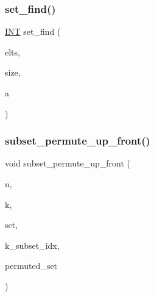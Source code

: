 \subsubsection{\texorpdfstring{set\+\_\+find()}{set\_find()}}
{\footnotesize\ttfamily \mbox{\hyperlink{galois_8h_a09fddde158a3a20bd2dcadb609de11dc}{I\+NT}} set\+\_\+find (\begin{DoxyParamCaption}\item[{\mbox{\hyperlink{galois_8h_a09fddde158a3a20bd2dcadb609de11dc}{I\+NT}} $\ast$}]{elts,  }\item[{\mbox{\hyperlink{galois_8h_a09fddde158a3a20bd2dcadb609de11dc}{I\+NT}}}]{size,  }\item[{\mbox{\hyperlink{galois_8h_a09fddde158a3a20bd2dcadb609de11dc}{I\+NT}}}]{a }\end{DoxyParamCaption})}

\mbox{\label{combinatorics_8_c_a99be40b32e22767e89574daed3ce3e46}} 
\subsubsection{\texorpdfstring{subset\+\_\+permute\+\_\+up\+\_\+front()}{subset\_permute\_up\_front()}}
{\footnotesize\ttfamily void subset\+\_\+permute\+\_\+up\+\_\+front (\begin{DoxyParamCaption}\item[{\mbox{\hyperlink{galois_8h_a09fddde158a3a20bd2dcadb609de11dc}{I\+NT}}}]{n,  }\item[{\mbox{\hyperlink{galois_8h_a09fddde158a3a20bd2dcadb609de11dc}{I\+NT}}}]{k,  }\item[{\mbox{\hyperlink{galois_8h_a09fddde158a3a20bd2dcadb609de11dc}{I\+NT}} $\ast$}]{set,  }\item[{\mbox{\hyperlink{galois_8h_a09fddde158a3a20bd2dcadb609de11dc}{I\+NT}} $\ast$}]{k\+\_\+subset\+\_\+idx,  }\item[{\mbox{\hyperlink{galois_8h_a09fddde158a3a20bd2dcadb609de11dc}{I\+NT}} $\ast$}]{permuted\+\_\+set }\end{DoxyParamCaption})}

\mbox{\label{combinatorics_8_c_a972781079daad8c73e7c89049c4650b6}} 
